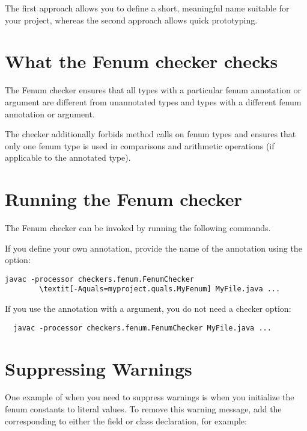 The first approach allows you to define a short, meaningful name suitable for
your project, whereas the second approach allows quick prototyping.



\section{What the Fenum checker checks}

The Fenum checker ensures that all types with a particular fenum annotation or
 argument are different from unannotated types and types with a
different fenum annotation or  argument.

The checker additionally forbids method calls on fenum types and ensures that
only one fenum type is used in comparisons and arithmetic operations (if
applicable to the annotated type).



\section{Running the Fenum checker}

The Fenum checker can be invoked by running the following commands.

If you define your own annotation, provide the name of the annotation using the
 option:

\begin{Verbatim}[commandchars=\\\[\]]
  javac -processor checkers.fenum.FenumChecker
        \textit[-Aquals=myproject.quals.MyFenum] MyFile.java ...
\end{Verbatim}

If you use the  annotation with a
 argument, you do not need a checker option:

\begin{Verbatim}
  javac -processor checkers.fenum.FenumChecker MyFile.java ...
\end{Verbatim}



\section{Suppressing Warnings}

One example of when you need to suppress warnings is when you initialize the
fenum constants to literal values.
To remove this warning message, add the corresponding  to either
the field or class declaration, for example:

